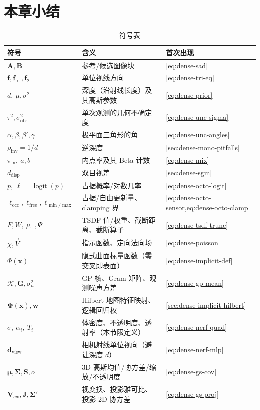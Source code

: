 \section*{本章小结}

\begin{table}[H]\centering\small
\caption{符号表}
\begin{tabular}{lll}
\toprule
符号 & 含义 & 首次出现 \\
\midrule
$\mathbf{A},\mathbf{B}$ & 参考/候选图像块 & \cref{eq:dense-sad} \\
$\mathbf{f},\mathbf{f}_{\mathrm{ref}},\mathbf{f}_2$ & 单位视线方向 & \cref{eq:dense-tri-eq} \\
$d,\ \mu,\sigma^2$ & 深度（沿射线长度）及其高斯参数 & \cref{eq:dense-prior} \\
$\tau^2,\sigma_{\mathrm{obs}}^2$ & 单次观测的几何不确定度 & \cref{eq:dense-unc-sigma} \\
$\alpha,\beta,\beta',\gamma$ & 极平面三角形的角 & \cref{eq:dense-unc-angles} \\
$\rho_{\mathrm{inv}}=1/d$ & 逆深度 & \cref{sec:dense-mono-pitfalls} \\
$\pi_{\mathrm{in}},\ a,b$ & 内点率及其 Beta 计数 & \cref{eq:dense-mix} \\
$d_{\mathrm{disp}}$ & 双目视差 & \cref{sec:dense-sgm} \\
$p,\ \ell=\operatorname{logit}(p)$ & 占据概率/对数几率 & \cref{eq:dense-octo-logit} \\
$\ell_{\mathrm{occ}},\ell_{\mathrm{free}},\ell_{\min/\max}$ & 占据/自由更新量、clamping 界 & \cref{eq:dense-octo-sensor,eq:dense-octo-clamp} \\
$F,W,\ \mu_{\mathrm{tr}},\Psi$ & TSDF 值/权重、截断距离、截断算子 & \cref{eq:dense-tsdf-trunc} \\
$\chi,\vec{V}$ & 指示函数、定向法向场 & \cref{eq:dense-poisson} \\
$\Phi(\mathbf{x})$ & 隐式曲面标量函数（零交叉即表面） & \cref{eq:dense-implicit-def} \\
$\mathcal{K},\mathbf{G},\sigma_n^2$ & GP 核、Gram 矩阵、观测噪声方差 & \cref{eq:dense-gp-mean} \\
$\boldsymbol{\Phi}(\mathbf{x}),\mathbf{w}$ & Hilbert 地图特征映射、逻辑回归权 & \cref{sec:dense-implicit-hilbert} \\
$\sigma,\ \alpha_i,\ T_i$ & 体密度、不透明度、透射率（本节限定义） & \cref{eq:dense-nerf-quad} \\
$\mathbf{d}_{\mathrm{view}}$ & 相机射线单位视向（避让深度 $d$） & \cref{eq:dense-nerf-mlp} \\
$\boldsymbol{\mu},\boldsymbol{\Sigma},\mathbf{S},o$ & 3D 高斯均值/协方差/缩放/不透明度 & \cref{eq:dense-gs-cov} \\
$\mathbf{V}_{cw},\mathbf{J},\boldsymbol{\Sigma}'$ & 视变换、投影雅可比、投影 2D 协方差 & \cref{eq:dense-gs-proj} \\
\bottomrule
\end{tabular}
\end{table}

